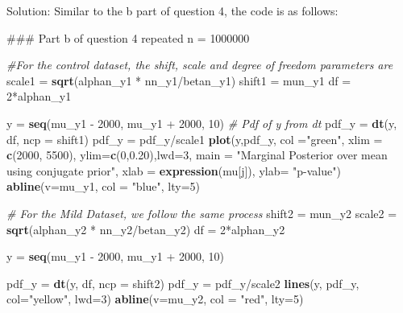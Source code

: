 \documentclass[]{article}
\newenvironment{Shaded}{\begin{snugshade}}{\end{snugshade}}
\newcommand{\KeywordTok}[1]{\textcolor[rgb]{0.13,0.29,0.53}{\textbf{{#1}}}}
\newcommand{\DataTypeTok}[1]{\textcolor[rgb]{0.13,0.29,0.53}{{#1}}}
\newcommand{\DecValTok}[1]{\textcolor[rgb]{0.00,0.00,0.81}{{#1}}}
\newcommand{\FloatTok}[1]{\textcolor[rgb]{0.00,0.00,0.81}{{#1}}}
\newcommand{\StringTok}[1]{\textcolor[rgb]{0.31,0.60,0.02}{{#1}}}
\newcommand{\CommentTok}[1]{\textcolor[rgb]{0.56,0.35,0.01}{\textit{{#1}}}}
\newcommand{\NormalTok}[1]{{#1}}
\begin{document}
Solution: Similar to the b part of question 4, the code is as follows:

\begin{Shaded}
\begin{Highlighting}[]
\NormalTok{### Part b of question 4 repeated}
\NormalTok{n =}\StringTok{ }\DecValTok{1000000}

\CommentTok{#For the control dataset, the shift, scale and degree of freedom parameters are}
\NormalTok{scale1 =}\StringTok{ }\KeywordTok{sqrt}\NormalTok{(alphan_y1 *}\StringTok{ }\NormalTok{nn_y1/betan_y1)}
\NormalTok{shift1 =}\StringTok{ }\NormalTok{mun_y1}
\NormalTok{df =}\StringTok{ }\DecValTok{2}\NormalTok{*alphan_y1}

\NormalTok{y =}\StringTok{ }\KeywordTok{seq}\NormalTok{(mu_y1 -}\StringTok{ }\DecValTok{2000}\NormalTok{, mu_y1 +}\StringTok{ }\DecValTok{2000}\NormalTok{, }\DecValTok{10}\NormalTok{)}
\CommentTok{# Pdf of y from dt}
\NormalTok{pdf_y =}\StringTok{ }\KeywordTok{dt}\NormalTok{(y, df, }\DataTypeTok{ncp =} \NormalTok{shift1)}
\NormalTok{pdf_y =}\StringTok{ }\NormalTok{pdf_y/scale1}
\KeywordTok{plot}\NormalTok{(y,pdf_y, }\DataTypeTok{col =}\StringTok{"green"}\NormalTok{, }\DataTypeTok{xlim =} \KeywordTok{c}\NormalTok{(}\DecValTok{2000}\NormalTok{, }\DecValTok{5500}\NormalTok{), }\DataTypeTok{ylim=}\KeywordTok{c}\NormalTok{(}\DecValTok{0}\NormalTok{,}\FloatTok{0.20}\NormalTok{),}\DataTypeTok{lwd=}\DecValTok{3}\NormalTok{, }\DataTypeTok{main =} \StringTok{"Marginal Posterior over mean using conjugate prior"}\NormalTok{, }\DataTypeTok{xlab =} \KeywordTok{expression}\NormalTok{(mu[j]), }\DataTypeTok{ylab=} \StringTok{"p-value"}\NormalTok{)}
\KeywordTok{abline}\NormalTok{(}\DataTypeTok{v=}\NormalTok{mu_y1, }\DataTypeTok{col =} \StringTok{"blue"}\NormalTok{, }\DataTypeTok{lty=}\DecValTok{5}\NormalTok{)}

\CommentTok{# For the Mild Dataset, we follow the same process}
\NormalTok{shift2 =}\StringTok{ }\NormalTok{mun_y2}
\NormalTok{scale2 =}\StringTok{ }\KeywordTok{sqrt}\NormalTok{(alphan_y2 *}\StringTok{ }\NormalTok{nn_y2/betan_y2)}
\NormalTok{df =}\StringTok{ }\DecValTok{2}\NormalTok{*alphan_y2}

\NormalTok{y =}\StringTok{ }\KeywordTok{seq}\NormalTok{(mu_y1 -}\StringTok{ }\DecValTok{2000}\NormalTok{, mu_y1 +}\StringTok{ }\DecValTok{2000}\NormalTok{, }\DecValTok{10}\NormalTok{)}

\NormalTok{pdf_y =}\StringTok{ }\KeywordTok{dt}\NormalTok{(y, df, }\DataTypeTok{ncp =} \NormalTok{shift2)}
\NormalTok{pdf_y =}\StringTok{ }\NormalTok{pdf_y/scale2}
\KeywordTok{lines}\NormalTok{(y, pdf_y, }\DataTypeTok{col=}\StringTok{"yellow"}\NormalTok{, }\DataTypeTok{lwd=}\DecValTok{3}\NormalTok{)}
\KeywordTok{abline}\NormalTok{(}\DataTypeTok{v=}\NormalTok{mu_y2, }\DataTypeTok{col =} \StringTok{"red"}\NormalTok{, }\DataTypeTok{lty=}\DecValTok{5}\NormalTok{)}


\end{Highlighting}
\end{Shaded}
\end{document}

